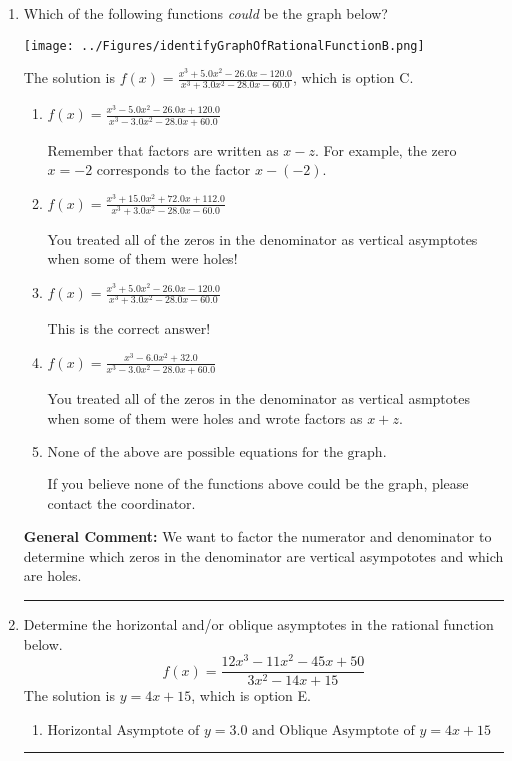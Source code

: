 \documentclass{extbook}[14pt]
\newcommand{\litem}[1]{\item #1

\rule{\textwidth}{0.4pt}}
\begin{document}
\begin{enumerate}\litem{
Which of the following functions \textit{could} be the graph below?

\begin{center}
    \texttt{[image: ../Figures/identifyGraphOfRationalFunctionB.png]}
\end{center}


The solution is \( f(x)=\frac{x^{3} +5.0 x^{2} -26.0 x -120.0}{x^{3} +3.0 x^{2} -28.0 x -60.0} \), which is option C.\begin{enumerate}[label=\Alph*.]
\item \( f(x)=\frac{x^{3} -5.0 x^{2} -26.0 x + 120.0}{x^{3} -3.0 x^{2} -28.0 x + 60.0} \)

Remember that factors are written as $x-z$. For example, the zero $x=-2$ corresponds to the factor $x-(-2)$.
\item \( f(x)=\frac{x^{3} +15.0 x^{2} +72.0 x + 112.0}{x^{3} +3.0 x^{2} -28.0 x -60.0} \)

You treated all of the zeros in the denominator as vertical asymptotes when some of them were holes!
\item \( f(x)=\frac{x^{3} +5.0 x^{2} -26.0 x -120.0}{x^{3} +3.0 x^{2} -28.0 x -60.0} \)

This is the correct answer!
\item \( f(x)=\frac{x^{3} -6.0 x^{2} + 32.0}{x^{3} -3.0 x^{2} -28.0 x + 60.0} \)

You treated all of the zeros in the denominator as vertical asmptotes when some of them were holes and wrote factors as $x+z$.
\item \( \text{None of the above are possible equations for the graph.} \)

If you believe none of the functions above could be the graph, please contact the coordinator.
\end{enumerate}

\textbf{General Comment:} We want to factor the numerator and denominator to determine which zeros in the denominator are vertical asympototes and which are holes.
}
\litem{
Determine the horizontal and/or oblique asymptotes in the rational function below.
\[ f(x) = \frac{12x^{3} -11 x^{2} -45 x + 50}{3x^{2} -14 x + 15} \]The solution is \( y = 4x + 15 \), which is option E.\begin{enumerate}[label=\Alph*.]
\item \( \text{Horizontal Asymptote of } y = 3.0 \text{ and Oblique Asymptote of } y = 4x + 15 \)


\end{enumerate}}
\end{enumerate}
\end{document}
